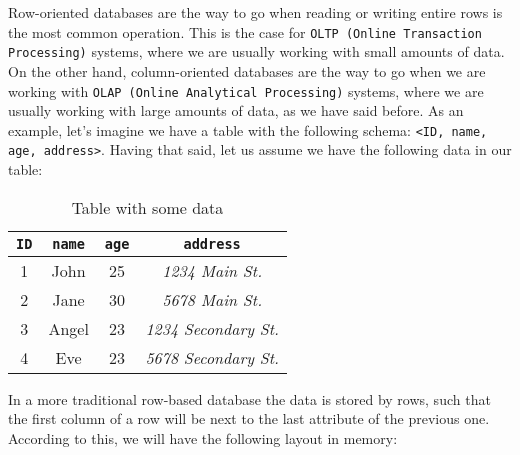 Row-oriented databases are the way to go when reading or writing entire rows is the most common operation. This is the case for \texttt{OLTP (Online Transaction Processing)} systems, where we are usually working with small amounts of data. On the other hand, column-oriented databases are the way to go when we are working with \texttt{OLAP (Online Analytical Processing)} systems, where we are usually working with large amounts of data, as we have said before. As an example, let's imagine we have a table with the following schema: \texttt{<ID, name, age, address>}. Having that said, let us assume we have the following data in our table:

\begin{table}[ht]
    \centering
    \begin{tabular}{|c|c|c|c|}
        \hline
        \rowcolor[HTML]{EFEFEF}
        \texttt{ID} & \texttt{name} & \texttt{age} & \texttt{address}            \\ \hline
        1           & John          & 25           & \textit{1234 Main St.}      \\ \hline
        2           & Jane          & 30           & \textit{5678 Main St.}      \\ \hline
        3           & Angel         & 23           & \textit{1234 Secondary St.} \\ \hline
        4           & Eve           & 23           & \textit{5678 Secondary St.} \\ \hline
    \end{tabular}
    \caption{Table with some data}
\end{table}

In a more traditional row-based database the data is stored by rows, such that the first column of a row will be next to the last attribute of the previous one. According to this, we will have the following layout in memory:

